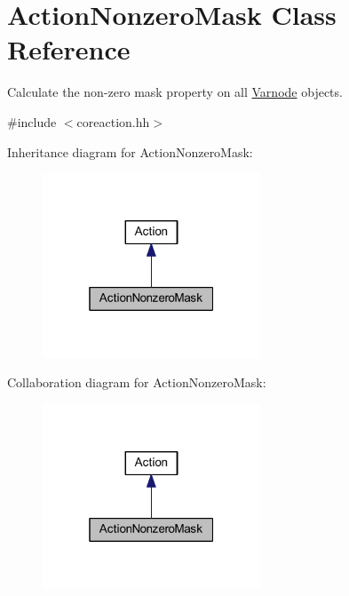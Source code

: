 \hypertarget{class_action_nonzero_mask}{}\section{Action\+Nonzero\+Mask Class Reference}
\label{class_action_nonzero_mask}


Calculate the non-\/zero mask property on all \mbox{\hyperlink{class_varnode}{Varnode}} objects.  




{\ttfamily \#include $<$coreaction.\+hh$>$}



Inheritance diagram for Action\+Nonzero\+Mask\+:
\nopagebreak
\begin{figure}[H]
\begin{center}
\leavevmode
\includegraphics[width=184pt]{class_action_nonzero_mask__inherit__graph}
\end{center}
\end{figure}


Collaboration diagram for Action\+Nonzero\+Mask\+:
\nopagebreak
\begin{figure}[H]
\begin{center}
\leavevmode
\includegraphics[width=184pt]{class_action_nonzero_mask__coll__graph}
\end{center}
\end{figure}
